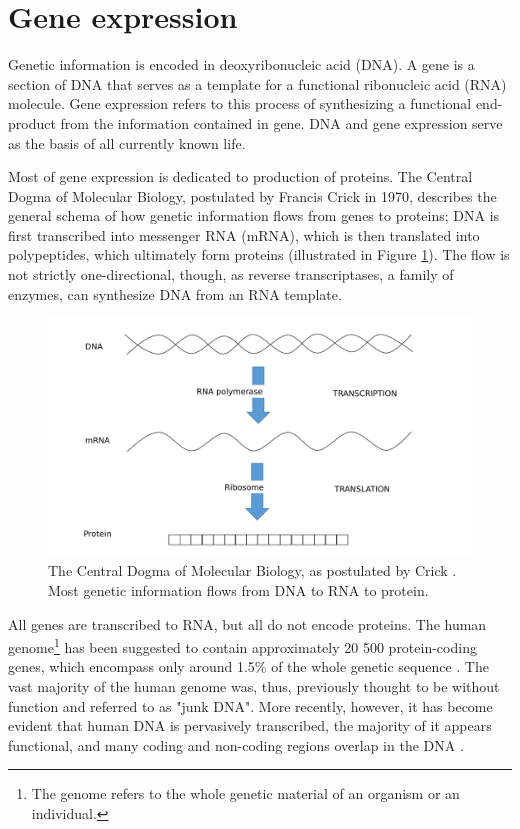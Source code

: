 
\section{Gene expression}\label{gene-expression}

Genetic information is encoded in deoxyribonucleic acid (DNA). A
gene is a section of DNA that serves as a template for a functional
ribonucleic acid (RNA) molecule. Gene expression refers to this process of
synthesizing a functional end-product from the information contained in gene.
DNA and gene expression serve as the basis of all currently known life. \citep{Strachan2011}

Most of gene expression is dedicated to production of proteins. The Central
Dogma of Molecular Biology, postulated by Francis Crick in 1970, describes the
general schema of how genetic information flows from genes to proteins; DNA is
first transcribed into messenger RNA (mRNA), which is then translated into
polypeptides, which ultimately form proteins \citep{Crick1970} (illustrated in
Figure \ref{fig:central-dogma}). The flow is not strictly one-directional,
though, as reverse transcriptases, a family of enzymes, can synthesize DNA
from an RNA template.

\begin{figure}[!h]
  \centering
  \includegraphics[width=.8\linewidth]{figures/central_dogma.pdf}
  \caption{The Central Dogma of Molecular Biology, as postulated by Crick \citep{Crick1970}.
  Most genetic information flows from DNA to RNA to protein.}
  \label{fig:central-dogma}
\end{figure}

All genes are transcribed to RNA, but all do not encode proteins. The
human genome\footnote{The genome refers to the whole genetic material of an
organism or an individual.} has been suggested to contain approximately 20 500
protein-coding genes, which encompass only around 1.5\% of the whole genetic
sequence \citep{Clamp2007}. The vast majority of the human genome was, thus,
previously thought to be without function and referred to as "junk DNA". More
recently, however, it has become evident that human DNA is pervasively
transcribed, the majority of it appears functional, and many coding and
non-coding regions overlap in the DNA \citep{Strachan2011}.

